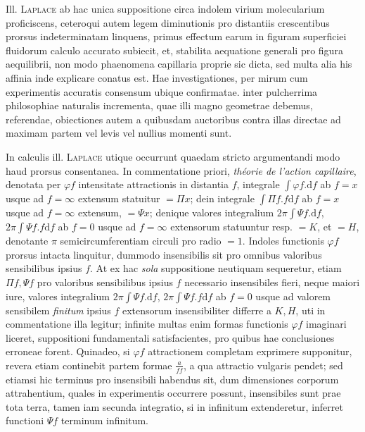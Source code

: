 Ill. \textsc{Laplace} ab hac unica suppositione circa indolem virium molecularium proficiscens, ceteroqui autem legem diminutionis pro distantiis crescentibus prorsus indeterminatam linquens, primus effectum earum in figuram superficiei fluidorum calculo accurato subiecit, et, stabilita aequatione generali pro figura aequilibrii, non modo phaenomena capillaria proprie sic dicta, sed multa alia his affinia inde explicare conatus est. Hae investigationes, per mirum cum experimentis accuratis consensum ubique confirmatae. inter pulcherrima philosophiae naturalis incrementa, quae illi magno geometrae debemus, referendae, obiectiones autem a quibusdam auctoribus contra illas directae ad maximam partem vel levis vel nullius momenti sunt.

In calculis ill. \textsc{Laplace} utique occurrunt quaedam stricto argumentandi modo haud prorsus consentanea. In commentatione priori, \textit{théorie de l’action capillaire}, denotata per $\varphi f$ intensitate attractionis in distantia $f$, integrale $\int\varphi f.\mathrm{d}f$ ab $f=x$ usque ad $f=\infty$ extensum statuitur $=\Pi x$; dein integrale $\int\Pi f.f\mathrm{d}f$ ab $f=x$ usque ad $f=\infty$ extensum, $=\Psi x$; denique valores integralium $2\pi\int\Psi f.\mathrm{d}f$, $2\pi\int\Psi f.f\mathrm{d}f$ ab $f=0$ usque ad $f=\infty$ extensorum statuuntur resp. $=K$, et $=H$, denotante $\pi$ semicircumferentiam circuli pro radio $=1$. Indoles functionis $\varphi f$ prorsus intacta linquitur, dummodo insensibilis sit pro omnibus valoribus sensibilibus ipsius $f$. At ex hac \textit{sola} suppositione neutiquam sequeretur, etiam $\Pi f,\Psi f$ pro valoribus sensibilibus ipsius $f$ necessario insensibiles fieri, neque maiori iure, valores integralium $2\pi\int\Psi f.\mathrm{d}f$, $2\pi\int\Psi f.f\mathrm{d}f$ ab $f=0$ usque ad valorem sensibilem \textit{finitum} ipsius $f$ extensorum insensibiliter differre a $K,H$, uti in commentatione illa legitur; infinite multas enim formas functionis $\varphi f$ imaginari liceret, suppositioni fundamentali satisfacientes, pro quibus hae conclusiones erroneae forent. Quinadeo, si $\varphi f$ attractionem completam exprimere supponitur, revera etiam continebit partem formae $\frac{a}{ff}$, a qua attractio vulgaris pendet; sed etiamsi hic terminus pro insensibili habendus sit, dum dimensiones corporum attrahentium, quales in experimentis occurrere possunt, insensibiles sunt prae tota terra, tamen iam secunda integratio, si in infinitum extenderetur, inferret functioni $\Psi f$ terminum infinitum.

